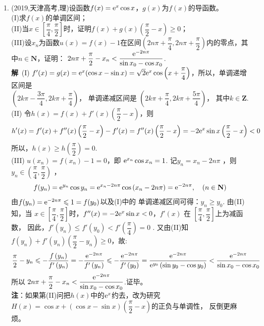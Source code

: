 \begin{enumerate}[label={【\textbf{例\thechapter.\arabic*}】},
 leftmargin=\inteval{\myenumleftmargin}pt,
 itemsep=\inteval{\myenumitempsep}pt,
 itemindent=\inteval{\myenumitemindent}pt]
\item (2019,天津高考,理)设函数$ f(x)=\mathrm{e}^x\cos x $，$ g(x) $为$ f(x) $的导函数。\\
(I)求$ f(x) $的单调区间；\\
(II)当$ x\in \left[\dfrac{\pi}{4},\dfrac{\pi}{2}\right] $时，证明$ f(x)+g(x)\left(\dfrac{\pi}{2}-x\right)\geq 0 $；\\
(III)设$ x_n $为函数$ u(x)=f(x)-1 $在区间$ \left(2n\pi+\dfrac{\pi}{4},2n\pi+
\dfrac{\pi}{2}\right) $内的零点，其中$ n\in \textbf{N} $，证明：
$ 2n\pi+\dfrac{\pi}{2}-x_n<\dfrac{\mathrm{e}^{-2n\pi}}{\sin x_0-\cos x_0} $.\\
\textbf{解}\ (I) $ f'(x)=g(x)=\mathrm{e}^x(\cos x-\sin x)=\sqrt{2}\mathrm{e}^x\cos\left(
x+\dfrac{\pi}{4}\right) $，所以，单调递增区间是 \\
$ \left(2k\pi-\dfrac{3\pi}{4},2k\pi+\dfrac{\pi}{4}\right) $，
单调递减区间是
$ \left(2k\pi+\dfrac{\pi}{4},2k\pi+\dfrac{5\pi}{4}\right) $，
其中$ k\in \textbf{Z} $. \\
(II) 令$ h(x)=f(x)+f'(x)\left(\dfrac{\pi}{2}-x\right) $，则
\begin{gather*}
    h'(x)= f'(x)+f''(x)\left(\dfrac{\pi}{2}-x\right)-f'(x)=
    f''(x)\left(\dfrac{\pi}{2}-x\right)
    =-2\mathrm{e}^x\sin x \left(\dfrac{\pi}{2}-x\right)<0
\end{gather*}
所以，$ h(x)\geq h\left(\dfrac{\pi}{2}\right)=0 $. \\
(III)  $ u(x_{n})=f(x_{n})-1=0 $，即
$ \mathrm{e}^{x_{n}}\cos x_{n}=1 $. 记$ y_{n}=x_{n}-2n\pi $ ，则
$ y_{n}\in\left(\dfrac{\pi}{4},\dfrac{\pi}{2}\right) $ ，
\begin{gather*}
    f(y_{n})=\mathrm{e}^{y_{n}}\cos y_{n}=\mathrm{e}^{x_{n}-2n\pi}
    \cos\left(x_{n}-2n\pi\right)=\mathrm{e}^{-2n\pi},\quad (n\in \textbf{N})
\end{gather*}
由$ f(y_{n})=\mathrm{e}^{-2n\pi}\leqslant 1=f(y_{0}) $以及(I)中的
单调递减区间可得：$ y_{n}\geqslant y_{0} $.
由(II)知，当 $ x\in\left[\dfrac{\pi}{4},\dfrac{\pi}{2}\right] $时，$ f''(x)=-2\mathrm{e}^x\sin x<0 $，$ f'(x) $ 在 $ \left[\dfrac{\pi}{4},\dfrac{\pi}{2}\right] $上为减函数，
因此，$ f'(y_{n})\leqslant  f'(y_{0})<f'\left(\dfrac{\pi}{4}\right)=0 $ .
又由(II)知 $ f(y_{n})+f'(y_{n})\left(\dfrac{\pi}{2}-y_{n}\right)\geqslant 0 $，故:
\begin{align*}
    \dfrac{\pi}{2}-y_{n}\leqslant-\dfrac{f\left(y_{n}\right)}{f'\left(y_{n}\right)}=-\dfrac{\mathrm{e}^{-2n\pi}}{f'\left(y_{n}\right)}\leqslant-\dfrac{\mathrm{e}^{-2n\pi}}{f'\left(y_{0}\right)}=\dfrac{\mathrm{e}^{-2n\pi}}{\mathrm{e}^{y_{0}}\left(\sin y_{0}-\cos y_{0}\right)}<\dfrac{\mathrm{e}^{-2n\pi}}{\sin x_{0}-\cos x_{0}}
\end{align*}
所以 $ 2n\pi+\dfrac{\pi}{2}-x_{n}<\dfrac{\mathrm{e}^{-2n\pi}}{\sin x_{0}-\cos x_{0}} $.证毕。 \\
\textbf{注}：如果第(II)问把$ h(x) $中的$ \mathrm{e}^x $约去，改为研究
$ H(x)=\cos x+(\cos x-\sin x)\left(\dfrac{\pi}{2}-x\right) $的正负与单调性，
反倒更麻烦。


\end{enumerate}
